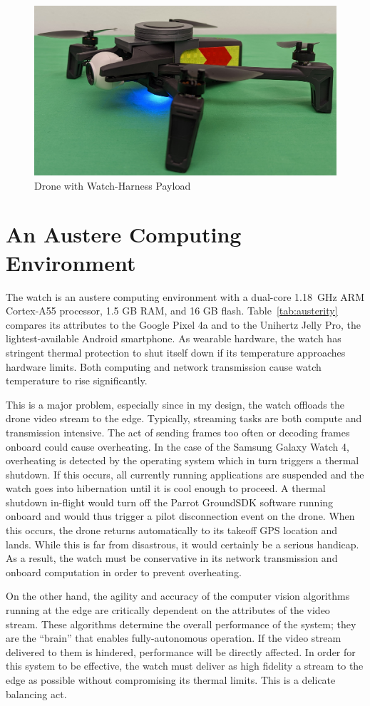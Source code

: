 \begin{figure}
    \centering
    \includegraphics[width=0.6\linewidth]{chapter3/FIGS/drone-watch-combo.jpg}
    \caption{Drone with Watch-Harness Payload}
    \label{fig:harness}
\end{figure}

\section{An Austere Computing Environment}
\label{sec:austere-computing}
The watch is an austere computing environment with a dual-core
1.18~GHz ARM Cortex-A55 processor, 1.5 GB RAM, and 16 GB flash.
Table~\ref{tab:austerity} compares its attributes to the Google Pixel 4a and to the Unihertz Jelly Pro, the lightest-available Android smartphone. As wearable hardware, the watch has stringent thermal protection to shut itself down if its temperature approaches hardware limits. Both computing and network transmission cause watch temperature to rise significantly.

This is a major problem, especially since in my design, the watch offloads the drone video stream to the edge. Typically, streaming tasks are both compute and transmission intensive. The act of sending frames too often or decoding frames onboard could cause overheating. In the case of the Samsung Galaxy Watch 4, overheating is detected by the operating system which in turn triggers a thermal shutdown. If this occurs, all currently running applications are suspended and the watch goes into hibernation until it is cool enough to proceed. A thermal shutdown in-flight would turn off the Parrot GroundSDK software running onboard and would thus trigger a pilot disconnection event on the drone. When this occurs, the drone returns automatically to its takeoff GPS location and lands. While this is far from disastrous, it would certainly be a serious handicap. As a result, the watch must be conservative in its network transmission and onboard computation in order to prevent overheating.

On the other hand, the agility and accuracy of the computer vision algorithms running at the edge are critically dependent on the attributes of the video stream. These algorithms determine the overall performance of the system; they are the ``brain'' that enables fully-autonomous operation. If the video stream delivered to them is hindered, performance will be directly affected. In order for this system to be effective, the watch must deliver as high fidelity a stream to the edge as possible without compromising its thermal limits. This is a delicate balancing act.

